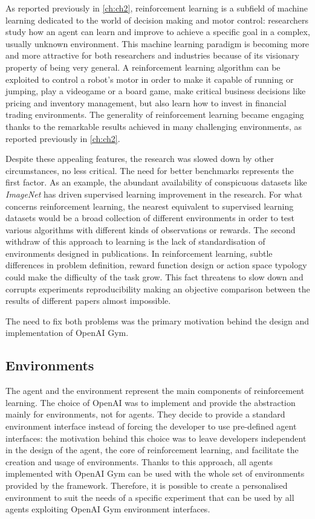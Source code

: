 As reported previously in  \vref{ch:ch2}, reinforcement learning is a subfield of machine learning dedicated to the world of decision making and motor control: researchers study how an agent can learn and improve to achieve a specific goal in a complex, usually unknown environment. This machine learning paradigm is becoming more and more attractive for both researchers and industries because of its visionary property of being very general. A reinforcement learning algorithm can be exploited to control a robot's motor in order to make it capable of running or jumping, play a videogame or a board game, make critical business decisions like pricing and inventory management, but also learn how to invest in financial trading environments. The generality of reinforcement learning became engaging thanks to the remarkable results achieved in many challenging environments, as reported previously in \vref{ch:ch2}.

Despite these appealing features, the research was slowed down by other circumstances, no less critical.
The need for better benchmarks represents the first factor. As an example, the abundant availability of conspicuous datasets like \textit{ImageNet} \cite{deng2009imagenet} has driven supervised learning improvement in the research. For what concerns reinforcement learning, the nearest equivalent to supervised learning datasets would be a broad collection of different environments in order to test various algorithms with different kinds of observations or rewards.
The second withdraw of this approach to learning is the lack of standardisation of environments designed in publications. In reinforcement learning, subtle differences in problem definition, reward function design or action space typology could make the difficulty of the task grow.  This fact threatens to slow down and corrupts experiments reproducibility making an objective comparison between the results of different papers almost impossible.

The need to fix both problems was the primary motivation behind the design and implementation of OpenAI Gym.

\subsection{Environments}

The agent and the environment represent the main components of reinforcement learning. The choice of OpenAI was to implement and provide the abstraction mainly for environments, not for agents. They decide to provide a standard environment interface instead of forcing the developer to use pre-defined agent interfaces: the motivation behind this choice was to leave developers independent in the design of the agent, the core of reinforcement learning, and facilitate the creation and usage of environments. Thanks to this approach, all agents implemented with OpenAI Gym can be used with the whole set of environments provided by the framework. Therefore, it is possible to create a personalised environment to suit the needs of a specific experiment that can be used by all agents exploiting OpenAI Gym environment interfaces.

